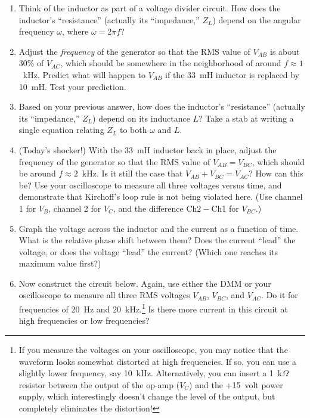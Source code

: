 \begin{enumerate}[wide]
\item Think of the inductor as part of a voltage divider circuit.  How does the inductor's ``resistance'' (actually its ``impedance,'' $Z_L$) depend on the angular frequency $\omega$, where $\omega = 2 \pi f$?

\item Adjust the \textit{frequency} of the generator so that the RMS value of $V_{AB}$ is about 30\% of $V_{AC}$, which should be somewhere in the neighborhood of around $f \approx 1$~kHz.  Predict what will happen to $V_{AB}$ if the 33~mH inductor is replaced by 10~mH.  Test your prediction.

\item Based on your previous answer, how does the inductor's ``resistance'' (actually its ``impedance,''  $Z_L$) depend on its inductance $L$?  Take a stab at writing a single equation relating $Z_L$ to both $\omega$ and $L$.
\label{part_guess_Z_L}

\item (Today's shocker!) With the 33~mH inductor back in place, adjust the frequency of the generator so that the RMS value of $V_{AB} = V_{BC}$, which should be around $f \approx 2$~kHz.   Is it still the case that $V_{AB} + V_{BC} = V_{AC}$?  How can this be?  Use your oscilloscope to measure all three voltages versus time, and demonstrate that Kirchoff's loop rule is not being violated here.  (Use channel 1 for $V_B$, channel 2 for $V_C$, and the difference Ch$2- $Ch1 for $V_{BC}$.)

\item Graph the voltage across the inductor and the current as a function of time.  What is the relative phase shift between them?  Does the current ``lead'' the voltage, or does the voltage ``lead'' the current? (Which one reaches its maximum value first?) \label{part_RL_graphs}

\newpage

\item Now construct the circuit below. Again, use either the DMM or your oscilloscope to measure all three RMS voltages  $V_{AB}$,  $V_{BC}$, and $V_{AC}$.   Do it for frequencies of 20~Hz and 20~kHz.\footnote{If you measure the voltages on your oscilloscope, you may notice that the waveform looks somewhat distorted at high frequencies.  If so, you can use a slightly lower frequency, say 10~kHz.  Alternatively, you can insert a 1~k$\Omega$ resistor between the output of the op-amp ($V_C$) and the +15~volt power supply, which interestingly doesn't change the level of the output, but completely eliminates the distortion!}  Is there more current in this circuit at high frequencies or low frequencies?


\end{enumerate}
